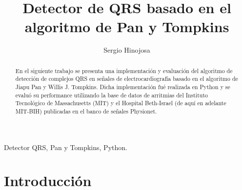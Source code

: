 \documentclass[%
        final,
        notitlepage,
        narroweqnarray,
        inline,
        ]{ieee}
\numberwithin{equation}{section}
\numberwithin{figure}{section}
\numberwithin{table}{section}
\begin{document}
\title[Implementación de un detector QRS]{%
       Detector de QRS basado en el algoritmo de Pan y Tompkins}

\author[SERGIO HINOJOSA]{%
      Sergio Hinojosa%
  }




\maketitle               

\begin{abstract}
En el siguiente trabajo se presenta una implementación y evaluación del algoritmo de detección de complejos QRS en señales de electrocardiografía basado en el algoritmo de Jiapu Pan y Willis J. Tompkins. Dicha implementación fué realizada en Python y se evaluó su performance utilizando la base de datos de arritmias del Instituto Tecnológico de Massachusetts (MIT) y el Hospital Beth-Israel (de aquí en adelante MIT-BIH) publicadas en el banco de señales Physionet.
\end{abstract}

\begin{keywords}
Detector QRS, Pan y Tompkins, Python.
\end{keywords}

\section{Introducción}
\end{document}
